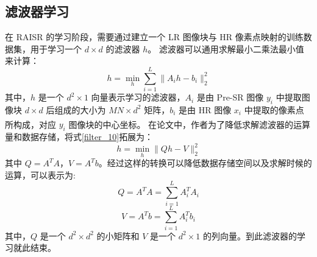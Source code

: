 \documentclass[12pt, a4paper, oneside]{ctexbook}
\begin{document}
	\subsection{滤波器学习}
	在 RAISR 的学习阶段，需要通过建立一个 LR 图像块与 HR 像素点映射的训练数据集，用于学习一个 $d\times d$ 的滤波器 $h$。
	滤波器可以通用求解最小二乘法最小值来计算：
	\begin{equation}
h=\min_h\sum_{i=1}^L\lVert{A_ih-b_i}\rVert_2^2 \label{filter_10}
	\end{equation} 
	其中，$h$ 是一个 $d^2 \times 1$ 向量表示学习的滤波器，$A_i$ 是由 Pre-SR 图像 $y_i$ 中提取图像块 $d\times d$ 后组成的大小为 $MN\times d^2$ 矩阵，$b_i$ 是由 HR 图像 $x_i$ 中提取的像素点所构成，对应 $y_i$ 图像块的中心坐标。
	在论文\textsuperscript{\cite{1}}中，作者为了降低求解滤波器的运算量和数据存储，将式\ref{filter_10}拓展为：
	\begin{equation}
h=\min_h\lVert Qh-V\rVert_2^2		\label{filter_11}
	\end{equation}
	其中 $Q=A^TA$，$V=A^Tb$。经过这样的转换可以降低数据存储空间以及求解时候的运算，可以表示为:
	\begin{equation}
Q=A^TA=\sum_{i=1}^LA_i^TA_i
	\end{equation}
	\begin{equation}
V=A^Tb=\sum_{i=1}^LA_i^Tb_i
	\end{equation}
其中，$Q$ 是一个 $d^2 \times d^2$ 的小矩阵和 $V$ 是一个 $d^2 \times 1$ 的列向量。到此滤波器的学习就此结束。
\end{document}
